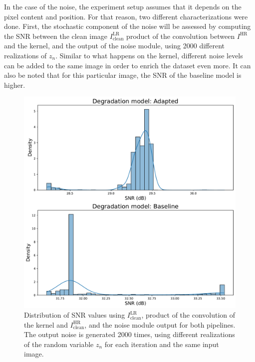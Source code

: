         In the case of the noise, the experiment setup assumes that it depends on the pixel content and position.
        For that reason, two different characterizations were done. 
        First, the stochastic component of the noise will be assessed by computing the SNR between the clean image $I^{\text{LR}}_{\text{clean}}$ product of the convolution between $I^{\text{HR}}$ and the kernel, and the output of the noise module, using 2000 different realizations of $z_n$.
        Similar to what happens on the kernel, different noise levels can be added to the same image in order to enrich the dataset even more. It can also be noted that for this particular image, the SNR of the baseline model is higher.

        
        \begin{figure}[H]
            \centering
            \includegraphics[width=\textwidth]{Includes/5-source-noise-1-sample.pdf}
            \caption{Distribution of SNR values using $I^{\text{LR}}_{\text{clean}}$, product of the convolution of the kernel and $I^{\text{HR}}_{\text{clean}}$, and the noise module output for both pipelines.
                     The output noise is generated 2000 times, using different realizations of the random variable $z_n$ for each iteration and the same input image.
                    }
            \label{fig:5-source-noise-1-sample}
        \end{figure}
        

